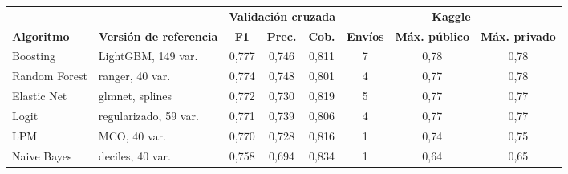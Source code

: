 \begin{tabular}{llcccccc}
\toprule
 & & \multicolumn{3}{c}{\textbf{Validación cruzada}} & \multicolumn{3}{c}{\textbf{Kaggle}} \\
\cmidrule(lr){3-5}\cmidrule(lr){6-8}
\textbf{Algoritmo} & \textbf{Versión de referencia} & \textbf{F1} & \textbf{Prec.} & \textbf{Cob.} & \textbf{Envíos} & \textbf{Máx. público} & \textbf{Máx. privado} \\
\midrule
Boosting & LightGBM, 149 var. & 0,777 & 0,746 & 0,811 & 7 & 0,78 & 0,78 \\
Random Forest & ranger, 40 var. & 0,774 & 0,748 & 0,801 & 4 & 0,77 & 0,78 \\
Elastic Net & glmnet, splines & 0,772 & 0,730 & 0,819 & 5 & 0,77 & 0,77 \\
Logit & regularizado, 59 var. & 0,771 & 0,739 & 0,806 & 4 & 0,77 & 0,77 \\
LPM & MCO, 40 var. & 0,770 & 0,728 & 0,816 & 1 & 0,74 & 0,75 \\
Naive Bayes & deciles, 40 var. & 0,758 & 0,694 & 0,834 & 1 & 0,64 & 0,65 \\
\bottomrule
\end{tabular}
